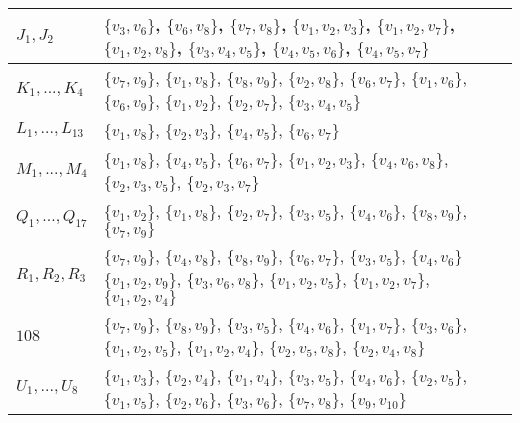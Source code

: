 \documentclass[10pt]{article}
\begin{document}
\begin{tabular}{|p{2cm}| p{}|}
\hline
$J_1,J_2$ & $\{v_3,v_6\}$, $\{v_6, v_8\}$, $\{v_7,v_8\}$, $\{v_1, v_2, v_3\}$, $\{v_1, v_2,v_7\}$, $\{v_1,v_2,v_8\}$, $\{v_3, v_4, v_5\}$, $\{v_4, v_5, v_6\}$, $\{v_4, v_5, v_7\}$ \\
\hline



$K_1,...,K_4$ & $\{v_7, v_9\}$, $\{v_1, v_8\}$, $\{v_8, v_9\}$, $\{v_2, v_8\}$, $\{v_6, v_7\}$, $\{v_1, v_6\}$, $\{v_6, v_9\}$, $\{v_1, v_2\}$, $\{ v_2, v_7\}$, $\{v_3, v_4, v_5\}$ \\
\hline

$L_1,...,L_{13}$ & $ \{v_1, v_8\}$, $\{v_2, v_3\}$, $\{v_4, v_5\}$, $\{v_6, v_7\}$  \\ \hline

$M_1,...,M_4$ & $\{v_1, v_8\}$, $\{v_4, v_5\}$, $\{v_6, v_7\}$, $\{v_1, v_2, v_3\}$, $\{v_4, v_6, v_8\}$, $\{v_2, v_3, v_5\}$, $\{v_2, v_3, v_7\}$  \\
\hline


$Q_1,...,Q_{17}$ & $\{v_1,v_2\}$, $\{v_1, v_8\}$, $\{v_2,v_7\}$, $\{v_3, v_5\}$, $\{v_4, v_6\}$, $\{v_8,v_9\}$, $\{v_7, v_9\}$ \\
\hline

$R_1,R_2,R_3$ & $\{v_7,v_9\}$, $\{v_4,v_8\}$, $\{v_8,v_9\}$, $\{v_6,v_7\}$, $\{v_3,v_5\}$, $\{v_4,v_6\}$ $\{v_1, v_2, v_9\}$, $\{v_3, v_6, v_8\}$, $\{v_1, v_2, v_5\}$, $\{v_1, v_2, v_7\}$, $\{v_1, v_2, v_4\}$ \\
\hline

$108$ & $\{v_7,v_9\}$, $\{v_8, v_9\}$, $\{v_3,v_5\}$, $\{v_4, v_6\}$, $\{v_1, v_7\}$, $\{v_3,v_6\}$, $\{v_1, v_2, v_5\}$, $\{v_1, v_2, v_4\}$, $\{v_2, v_5, v_8\}$, $\{v_2, v_4, v_8\}$ \\ \hline 

$U_1,...,U_8$ & $\{v_1, v_3\}$, $\{v_2, v_4\}$, $\{v_1, v_4\}$, $\{v_3, v_5\}$, $\{v_4, v_6\}$, $\{v_2, v_5\}$, $\{v_1, v_5\}$, $\{v_2, v_6\}$, $\{ v_3, v_6\}$,  $\{ v_7, v_8\}$,  $\{ v_9, v_{10}\}$ \\
\hline


\end{tabular}
\end{document}

